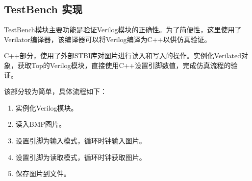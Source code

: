 \documentclass[12pt, a4paper]{article}
\begin{document}
\subsection{TestBench 实现}

TestBench模块主要功能是验证Verilog模块的正确性。为了简便性，这里使用了Verilator编译器，该编译器可以将Verilog编译为C++以供仿真验证。

C++部分，使用了外部STBI库对图片进行读入和写入的操作。实例化Verilated对象，获取Top的Verilog模块，直接使用C++设置引脚数值，完成仿真流程的验证。

该部分较为简单，具体流程如下：

\begin{enumerate}
    \item 实例化Verilog模块。
    \item 读入BMP图片。
    \item 设置引脚为输入模式，循环时钟输入图片。
    \item 设置引脚为读取模式，循环时钟获取图片。
    \item 保存图片到文件。
\end{enumerate}
\end{document}
